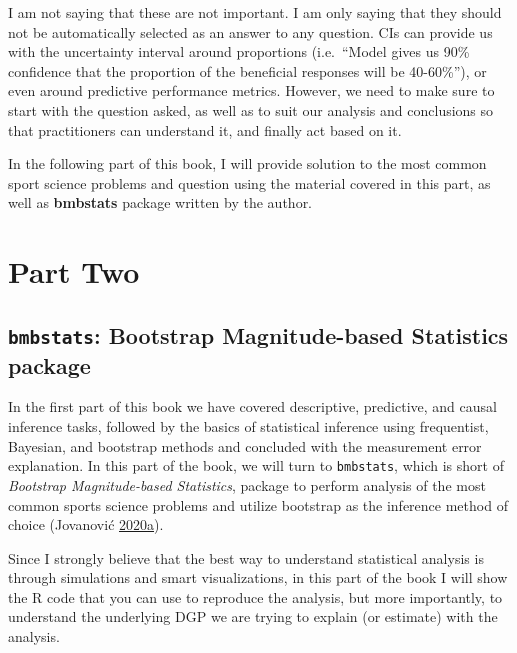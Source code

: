 \documentclass[
]{book}
\begin{document}
I am not saying that these are not important. I am only saying that they should not be automatically selected as an answer to any question. CIs can provide us with the uncertainty interval around proportions (i.e.~``Model gives us 90\% confidence that the proportion of the beneficial responses will be 40-60\%''), or even around predictive performance metrics. However, we need to make sure to start with the question asked, as well as to suit our analysis and conclusions so that practitioners can understand it, and finally act based on it.

In the following part of this book, I will provide solution to the most common sport science problems and question using the material covered in this part, as well as \textbf{bmbstats} package written by the author.

\hypertarget{part-part-two}{%
\part{Part Two}\label{part-part-two}}

\hypertarget{bmbstats-bootstrap-magnitude-based-statistics-package}{%
\chapter{\texorpdfstring{\texttt{bmbstats}: Bootstrap Magnitude-based Statistics package}{bmbstats: Bootstrap Magnitude-based Statistics package}}\label{bmbstats-bootstrap-magnitude-based-statistics-package}}

In the first part of this book we have covered descriptive, predictive, and causal inference tasks, followed by the basics of statistical inference using frequentist, Bayesian, and bootstrap methods and concluded with the measurement error explanation. In this part of the book, we will turn to \texttt{bmbstats}, which is short of \emph{Bootstrap Magnitude-based Statistics}, package to perform analysis of the most common sports science problems and utilize bootstrap as the inference method of choice (Jovanović \protect\hyperlink{ref-R-bmbstats}{2020}\protect\hyperlink{ref-R-bmbstats}{a}).

Since I strongly believe that the best way to understand statistical analysis is through simulations and smart visualizations, in this part of the book I will show the R code that you can use to reproduce the analysis, but more importantly, to understand the underlying DGP we are trying to explain (or estimate) with the analysis.
\end{document}
